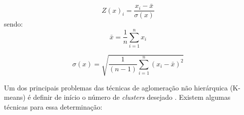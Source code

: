 \begin{equation}\label{eq:z-score}
Z(x)_{i} = \frac{x_{i} - \bar{x}}{\sigma(x)}
\end{equation}
sendo:
\begin{equation}\label{eq:media}
\bar{x} = \frac{1}{n} \sum_{i=1}^{n} x_{i}
\end{equation}

\begin{equation}\label{eq:desvio-padrao}
\sigma(x) = \sqrt{\frac{1}{(n-1)} \sum_{i=1}^{n}(x_{i}-\bar{x})^2 }
\end{equation}

\newpage
Um dos principais problemas das técnicas de aglomeração não hierárquica (K-means) é definir de início o número de \textit{clusters} desejado \cite{HARTIGAN1985, FAVERO2009, EVERITT2011}. Existem algumas técnicas para essa determinação:

